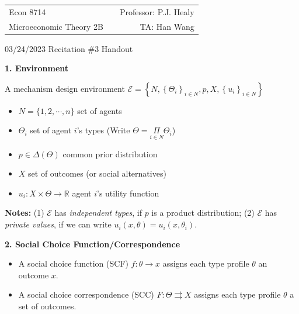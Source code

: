 \documentclass[11pt,leqno]{article}
\begin{document}
\vspace*{-20mm}

\begin{tabular*}{\textwidth}{@{\extracolsep{\fill}}lcr}
Econ 8714     & \hfill    &         Professor: P.J. Healy          \\
Microeconomic Theory 2B  &           &   TA: Han Wang    
\end{tabular*}

\bigskip
\begin{center}
{\Large 03/24/2023 Recitation \#3 Handout}
\end{center}

\bigskip

\textbf{1. Environment}


A mechanism design environment $\mathcal{E}=\left\{N,\left\{\Theta_i\right\}_{i \in N}, p, X,\left\{u_i\right\}_{i \in N}\right\}$
\begin{itemize}
    \item $N=\{1,2, \cdots, n\}$ \quad set of agents
    \item $\Theta_{i}$  \quad  set of agent $i$'s types (Write $\Theta=\underset{i\in N}{\Pi}\Theta_{i}$)
    \item $p \in \Delta(\Theta)$ \quad common prior distribution
    \item $X$ \quad set of outcomes (or social alternatives)
    \item $u_{i}: X \times \Theta \rightarrow \mathbb{R}$ \quad agent $i$'s utility function
\end{itemize}
\textbf{Notes:} (1) $\mathcal{E}$ has \emph{independent types}, if $p$ is a product distribution; (2) $\mathcal{E}$ has \emph{private values}, if we can write $u_{i}(x,\theta)=u_{i}(x,\theta_{i})$. 

\textbf{2. Social Choice Function/Correspondence}

\begin{itemize}
\item A social choice function (SCF)
$f: \theta \rightarrow x$ assigns each type profile $\theta$ an outcome $x$.
\item A social choice correspondence (SCC) $F: \Theta \rightrightarrows X$ assigns each type profile $\theta$ a set of outcomes.
\end{itemize}
\end{document}
